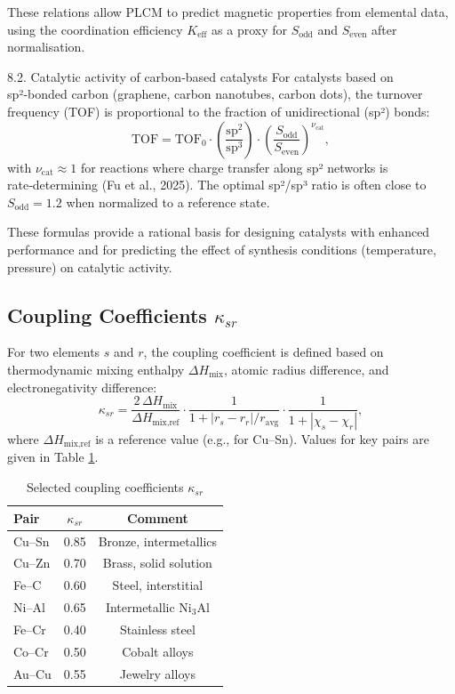 \documentclass[12pt,a4paper]{article}
\begin{document}
	These relations allow PLCM to predict magnetic properties from elemental data, using the coordination efficiency \(K_{\text{eff}}\) as a proxy for \(S_{\text{odd}}\) and \(S_{\text{even}}\) after normalisation.
	
	8.2. Catalytic activity of carbon‑based catalysts
	For catalysts based on sp²‑bonded carbon (graphene, carbon nanotubes, carbon dots), the turnover frequency (TOF) is proportional to the fraction of unidirectional (sp²) bonds:
	\[
	\text{TOF} = \text{TOF}_0 \cdot \left( \frac{\text{sp}^2}{\text{sp}^3} \right) \cdot \left( \frac{S_{\text{odd}}}{S_{\text{even}}} \right)^{\nu_{\text{cat}}},
	\]
	with \(\nu_{\text{cat}} \approx 1\) for reactions where charge transfer along sp² networks is rate‑determining (Fu et al., 2025). The optimal sp²/sp³ ratio is often close to \(S_{\text{odd}} = 1.2\) when normalized to a reference state.
	
	These formulas provide a rational basis for designing catalysts with enhanced performance and for predicting the effect of synthesis conditions (temperature, pressure) on catalytic activity.
	
	\subsection{Coupling Coefficients \(\kappa_{sr}\)}
	
	For two elements \(s\) and \(r\), the coupling coefficient is defined based on thermodynamic mixing enthalpy \(\Delta H_{\text{mix}}\), atomic radius difference, and electronegativity difference:
	\[
	\kappa_{sr} = \frac{2\,\Delta H_{\text{mix}}}{\Delta H_{\text{mix,ref}}} \cdot
	\frac{1}{1 + |r_s - r_r|/r_{\text{avg}}} \cdot
	\frac{1}{1 + |\chi_s - \chi_r|},
	\]
	where \(\Delta H_{\text{mix,ref}}\) is a reference value (e.g., for Cu–Sn). Values for key pairs are given in Table \ref{tab:kappa}.
	
	\begin{table}[htbp]
		\centering
		\caption{Selected coupling coefficients \(\kappa_{sr}\)}
		\label{tab:kappa}
		\begin{tabular}{lcc}
			\toprule
			Pair & \(\kappa_{sr}\) & Comment \\
			\midrule
			Cu–Sn & 0.85 & Bronze, intermetallics \\
			Cu–Zn & 0.70 & Brass, solid solution \\
			Fe–C  & 0.60 & Steel, interstitial \\
			Ni–Al & 0.65 & Intermetallic Ni$_{3}$Al \\
			Fe–Cr & 0.40 & Stainless steel \\
			Co–Cr & 0.50 & Cobalt alloys \\
			Au–Cu & 0.55 & Jewelry alloys \\
			\bottomrule
		\end{tabular}
	\end{table}
	
\end{document}
